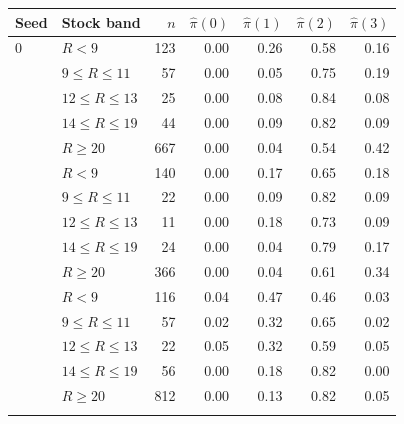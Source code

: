 \begin{tabular}{llrrrrr}
\toprule
Seed & Stock band & $n$ & $\hat\pi(0)$ & $\hat\pi(1)$ & $\hat\pi(2)$ & $\hat\pi(3)$ \\
\midrule
0 & $R<9$ & 123 & 0.00 & 0.26 & 0.58 & 0.16 \\
 & $9\le R\le 11$ & 57 & 0.00 & 0.05 & 0.75 & 0.19 \\
 & $12\le R\le 13$ & 25 & 0.00 & 0.08 & 0.84 & 0.08 \\
 & $14\le R\le 19$ & 44 & 0.00 & 0.09 & 0.82 & 0.09 \\
 & $R\ge 20$ & 667 & 0.00 & 0.04 & 0.54 & 0.42 \\
\addlinespace
1 & $R<9$ & 140 & 0.00 & 0.17 & 0.65 & 0.18 \\
 & $9\le R\le 11$ & 22 & 0.00 & 0.09 & 0.82 & 0.09 \\
 & $12\le R\le 13$ & 11 & 0.00 & 0.18 & 0.73 & 0.09 \\
 & $14\le R\le 19$ & 24 & 0.00 & 0.04 & 0.79 & 0.17 \\
 & $R\ge 20$ & 366 & 0.00 & 0.04 & 0.61 & 0.34 \\
\addlinespace
2 & $R<9$ & 116 & 0.04 & 0.47 & 0.46 & 0.03 \\
 & $9\le R\le 11$ & 57 & 0.02 & 0.32 & 0.65 & 0.02 \\
 & $12\le R\le 13$ & 22 & 0.05 & 0.32 & 0.59 & 0.05 \\
 & $14\le R\le 19$ & 56 & 0.00 & 0.18 & 0.82 & 0.00 \\
 & $R\ge 20$ & 812 & 0.00 & 0.13 & 0.82 & 0.05 \\
\addlinespace
\bottomrule
\end{tabular}

